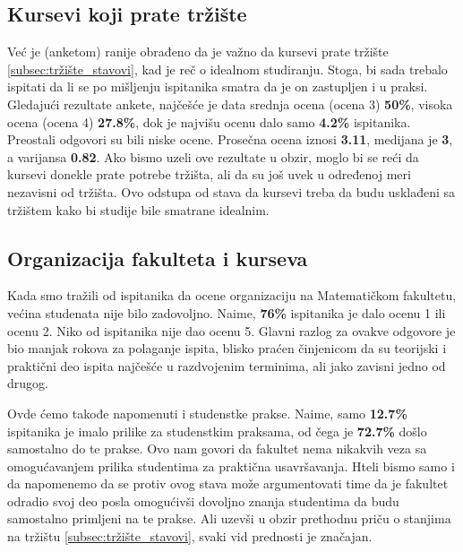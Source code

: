 \documentclass[a4paper]{article}
\begin{document}
{\subsection{Kursevi koji prate tržište}
\label{subsec:tržište_iskustva}

Već je (anketom) ranije obrađeno da je važno da kursevi prate tržište \ref{subsec:tržište_stavovi}, kad je reč o idealnom studiranju. Stoga, bi sada trebalo ispitati da li se po mišljenju ispitanika smatra da je on zastupljen i u praksi. Gledajući rezultate ankete, najčešće je data srednja ocena (ocena 3) \textbf{50\%}, visoka ocena (ocena 4) \textbf{27.8\%}, dok je najvišu ocenu dalo samo \textbf{4.2\%} ispitanika. Preostali odgovori su bili niske ocene. Prosečna ocena iznosi \textbf{3.11}, medijana je \textbf{3}, a varijansa \textbf{0.82}. Ako bismo uzeli ove rezultate u obzir, moglo bi se reći da kursevi donekle prate potrebe tržišta, ali da su još uvek u određenoj meri nezavisni od tržišta. Ovo odstupa od stava da kursevi treba da budu usklađeni sa tržištem kako bi studije bile smatrane idealnim.

\subsection{Organizacija fakulteta i kurseva}
\label{subsec:organizacija_iskustva}

Kada smo tražili od ispitanika da ocene organizaciju na Matematičkom fakultetu, većina studenata nije bilo zadovoljno. Naime, \textbf{76\%} ispitanika je dalo ocenu 1 ili ocenu 2. Niko od ispitanika nije dao ocenu 5. Glavni razlog za ovakve odgovore je bio manjak rokova za polaganje ispita, blisko praćen činjenicom da su teorijski i praktični deo ispita najčešće u razdvojenim terminima, ali jako zavisni jedno od drugog.

Ovde ćemo takođe napomenuti i studenstke prakse. Naime, samo \textbf{12.7\%} ispitanika je imalo prilike za studenstkim praksama, od čega je \textbf{72.7\%} došlo samostalno do te prakse. Ovo nam govori da fakultet nema nikakvih veza sa omogućavanjem prilika studentima za praktična usavršavanja. Hteli bismo samo i da napomenemo da se protiv ovog stava može argumentovati time da je fakultet odradio svoj deo posla omogućivši dovoljno znanja studentima da budu samostalno primljeni na te prakse. Ali uzevši u obzir prethodnu priču o stanjima na tržištu \ref{subsec:tržište_stavovi}, svaki vid prednosti je značajan.

}
\end{document}
